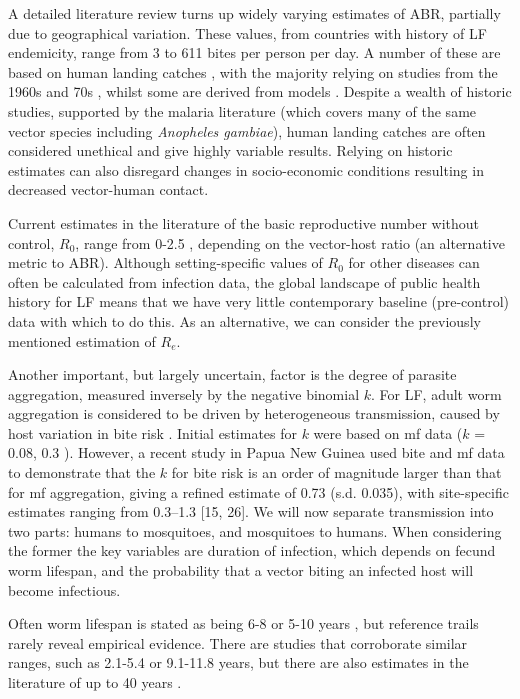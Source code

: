A detailed literature review turns up widely varying estimates of ABR, partially due to geographical variation. These values, from countries with history of LF endemicity, range from 3 \cite{Killeen2000} to 611 \cite{Michael2016} bites per person per day. A number of these are based on human landing catches \cite{Killeen2000,Michael2016,Braack2015}, with the majority relying on studies from the 1960s and 70s \cite{Michael2016}, whilst some are derived from models \cite{Stolk2005}. Despite a wealth of historic studies, supported by the malaria literature (which covers many of the same vector species including \textit{Anopheles gambiae}), human landing catches are often considered unethical and give highly variable results. Relying on historic estimates can also disregard changes in socio-economic conditions resulting in decreased vector-human contact.

Current estimates in the literature of the basic reproductive number without control, $R_0$, range from 0-2.5 \cite{Stone2014}, depending on the vector-host ratio (an alternative metric to ABR). Although setting-specific values of $R_0$ for other diseases can often be calculated from infection data, the global landscape of public health history for LF means that we have very little contemporary baseline (pre-control) data with which to do this. As an alternative, we can consider the previously mentioned estimation of $R_e$.

Another important, but largely uncertain, factor is the degree of parasite aggregation, measured inversely by the negative binomial $k$. For LF, adult worm aggregation is considered to be driven by heterogeneous transmission, caused by host variation in bite risk \cite{Irvine2018}. Initial estimates for $k$ were based on mf data ($k$ = 0.08, 0.3 \cite{irvine2015,Irvine2017_Mosquitobite}). However, a recent study in Papua New Guinea used bite and mf data to demonstrate that the $k$ for bite risk is an order of magnitude larger than that for mf aggregation, giving a refined estimate of 0.73 (s.d. 0.035), with site-specific estimates ranging from 0.3--1.3 [15, 26]. We will now separate transmission into two parts: humans to mosquitoes, and mosquitoes to humans. When considering the former the key variables are duration of infection, which depends on fecund worm lifespan, and the probability that a vector biting an infected host will become infectious. 

Often worm lifespan is stated as being 6-8 \cite{WHO2019_FactSheet} or 5-10 years \cite{Norman2000_epifil,Stolk2006}, but reference trails rarely reveal empirical evidence. There are studies that corroborate similar ranges, such as 2.1-5.4 \cite{Vanamail1996} or 9.1-11.8 \cite{Subramanian2004} years, but there are also estimates in the literature of up to 40 years \cite{Carme1979}.

